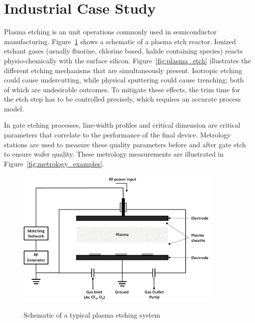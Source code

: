 \section{Industrial Case Study}
Plasma etching \cite{Plummer2000} is an unit operations commonly used in semiconductor manufacturing. Figure~\ref{fig:plasma_etcher} shows a schematic of a plasma etch reactor.
Ionized etchant gases (usually fluorine, chlorine based, halide containing species)
reacts physio-chemically with the surface silicon. Figure~\ref{fig:plasma_etch} illustrates the different etching mechanisms that are simultaneously present. Isotropic etching could cause undercutting, while physical sputtering could cause trenching; both of which are undesirable
outcomes. To mitigate these effects, the trim time for the etch step has to
be controlled precisely, which requires an accurate process model.

In gate etching processes, line-width profiles and critical dimension are
critical parameters that correlate to the performance of the final device.
Metrology stations are used to measure these quality parameters before and
after gate etch to ensure wafer quality. These metrology measurements are
illustrated in Figure~\ref{fig:metrology_examples}.

\begin{figure}[!htpb]
  \centering
  \includegraphics[width=0.9\textwidth]{figures/intro/plasma_etcher.png}\\
  \caption{Schematic of a typical plasma etching system}
  \label{fig:plasma_etcher}
\end{figure}

